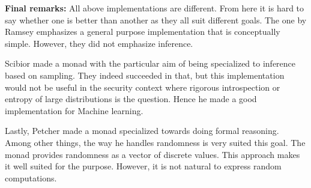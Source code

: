 
\textbf{Final remarks:} All above implementations are different. From here it is hard
to say whether one is better than another as they all suit different goals. The one
by Ramsey emphasizes a general purpose implementation that is conceptually simple.
However, they did not emphasize inference.

Scibior made a monad with the particular aim of being specialized to inference
based on sampling. They indeed succeeded in that, but this implementation
would not be useful in the security context where rigorous introspection or
entropy of large distributions is the question. Hence he made a good
implementation for Machine learning.

Lastly, Petcher made a monad specialized towards doing formal reasoning.
Among other things, the way he handles randomness is very suited this goal.
The monad provides randomness as a vector of discrete values. This approach
makes it well suited for the purpose. However, it is not natural to express
random computations.